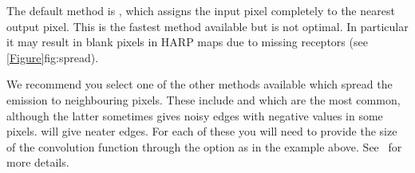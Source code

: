 \documentclass[11pt,oneside,chapters]{starlink}
\begin{document}
The default method is , which assigns the input pixel
completely to the nearest output pixel. This is the fastest method
available but is not optimal. In particular it may result in blank
pixels in HARP maps due to missing receptors (see
\cref{Figure}{fig:spread}{}).


We recommend you select one of the other methods available which
spread the emission to neighbouring pixels.  These include
 and  which are the most common, although
the latter sometimes gives noisy edges with negative values in some
pixels.  will give neater edges. For each of these you
will need to provide the size of the convolution function through the
 option as in the example above. See \smurfsun\ for more
details.
\end{document}
